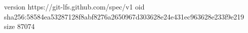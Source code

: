 version https://git-lfs.github.com/spec/v1
oid sha256:58584ea53287128f8abf8276a2650967d303628e24e431ec963628e233f9e219
size 87074
